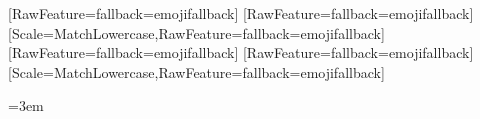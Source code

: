 \usepackage{fontspec}
\setmainfont{"HelveticaNeue"}[RawFeature={fallback=emojifallback}]
\setsansfont{"HelveticaNeue"}[RawFeature={fallback=emojifallback}]
\setmonofont{"Menlo"}[Scale=MatchLowercase,RawFeature={fallback=emojifallback}]
[RawFeature={fallback=emojifallback}]
[RawFeature={fallback=emojifallback}]
[Scale=MatchLowercase,RawFeature={fallback=emojifallback}]

\usepackage{microtype}
\usepackage[hyphens]{url}
\usepackage{hyperref}
\usepackage{fvextra}
\sloppy
\emergencystretch=3em

\usepackage{fancyhdr}
\pagestyle{fancy}
\fancyhf{}               %
\fancyfoot[C]{\thepage}  %
\renewcommand{\headrulewidth}{0pt}


\usepackage{titling}
\pretitle{\begin{center}\Huge\bfseries}
\posttitle{\par\end{center}\vspace{3em}}

\raggedbottom

\setlength{\footskip}{35pt}

\usepackage{caption}
\captionsetup[figure]{labelformat=empty}

\usepackage{etoolbox}
\makeatletter
\preto{\@floatboxreset}{\centering}
\makeatother

\renewcommand{\labelitemi}{\textbullet}
\renewcommand{\labelitemii}{\textbullet}
\renewcommand{\labelitemiii}{\textbullet}
\renewcommand{\labelitemiv}{\textbullet}

\frenchspacing

\usepackage{xcolor}
\usepackage{framed}
\renewenvironment{quote}
  {%
    \vspace{1.0\baselineskip} %
    \def\FrameCommand{%
      {\color{quoteblue}\vrule width 2pt}\hspace{0.8em}%
    }%
    \MakeFramed{\advance\hsize-\width\FrameRestore}%
    \noindent\ignorespaces
  }
  {%
    \endMakeFramed
    \vspace{0.5\baselineskip} %
  }

